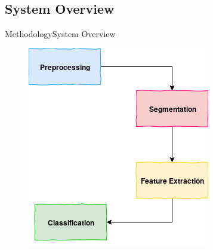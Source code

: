 \documentclass[10pt]{beamer}
\begin{document}
\subsection{System Overview}
\begin{frame}{Methodology}{System Overview}
\begin{figure}
	\centering
	\includegraphics[scale = 0.5]{AAUgraphics/presentation.png}
\end{figure}{}
\end{frame}

\end{document}
